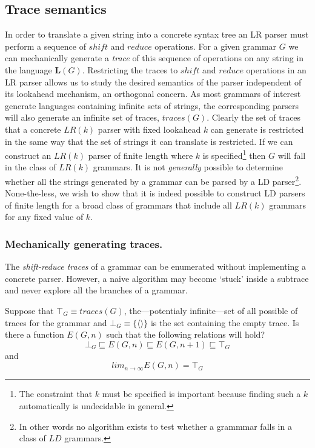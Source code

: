\documentclass[A4]{sig-alternate}
\begin{document}
\subsection{Trace semantics}

In order to translate a given string into a concrete syntax tree an LR parser must perform a sequence of $shi\!ft$ and $reduce$ operations.
For a given grammar $G$ we can mechanically generate a \emph{trace} of this sequence of operations on any string in the language $\boldsymbol{L}(G)$.
Restricting the traces to $shi\!ft$ and $reduce$ operations in an LR parser allows us to study the desired semantics of the parser independent of its lookahead mechanism, an orthogonal concern.
As most grammars of interest generate languages containing infinite sets of strings, the corresponding parsers will also generate an infinite set of traces, $traces(G)$.
Clearly the set of traces that a concrete $LR(k)$ parser with fixed lookahead $k$ can generate is restricted in the same way that the set of strings it can translate is restricted.
If we can construct an $LR(k)$ parser of finite length where $k$ is specified\footnote{The constraint that $k$ must be specified is important because finding such a $k$ automatically is undecidable in general.}
then $G$ will fall in the class of $LR(k)$ grammars.
It is not \emph{generally} possible to determine whether all the strings generated by a grammar can be parsed by a LD parser\footnote{In other words no algorithm exists to test whether a grammmar falls in a class of $LD$ grammars.}.
None-the-less, we wish to show that it is indeed possible to construct LD parsers of finite length for a broad class of grammars that include all $LR(k)$ grammars for any fixed value of $k$.


\subsubsection{Mechanically generating traces.}

The \emph{shift-reduce traces} of a grammar can be enumerated without implementing a concrete parser.
However, a naive algorithm may become `stuck' inside a subtrace and never explore all the branches of a grammar.

Suppose that $\top_{G} \equiv traces(G)$, the---potentialy infinite---set of all possible of traces for the grammar and $\bot_{G} \equiv \{ \langle \rangle \}$ is the set containing the empty trace.
Is there a function $E(G,n)$ such that the following relations will hold?
\begin{equation*} \bot_{G} \sqsubseteq E(G, n) \sqsubseteq E(G, n+1) \sqsubseteq \top_{G} \end{equation*}
and
\begin{equation*} lim_{n \to \infty} E(G,n) = \top_{G} \end{equation*}
\end{document}
